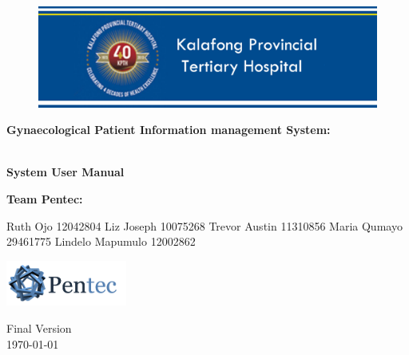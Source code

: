 \documentclass[a4paper,12pt]{report}
\begin{document}
\begin{titlepage}
	\begin{center}
		
		\begin{figure}[t]
			\centering
			\includegraphics[width=450px]{KPTH_Logo}
		\end{figure}		
		
		\textbf{\LARGE Gynaecological Patient Information
		management System:}
		
		\vspace{1 cm}
	    \textbf{\LARGE \\System User Manual }
		
		\vspace{1 cm}
		\LARGE{\textbf{Team Pentec: }}
		

		\begin{flushright} \large
			
			Ruth Ojo 12042804\newline
			Liz Joseph 10075268\newline
			Trevor Austin 11310856\newline
			Maria Qumayo 29461775\newline
			Lindelo Mapumulo 12002862\newline
		\end{flushright}
		
				\vspace{1 cm}
				\centering
				\includegraphics[width=150px]{Pentec_Logo}

		
		
		{\LARGE Final Version}
		\\
		{\large \today}		
		
		
	\end{center}
\end{titlepage}
\end{document}
